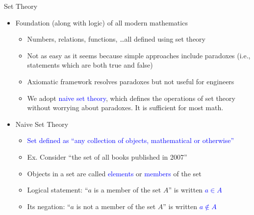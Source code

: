 \documentclass[10pt,english]{beamer}
\begin{document}
\begin{frame}{Set Theory}

\begin{itemize}
\setlength\itemsep{3mm}
\item<1-> Foundation (along with logic) of all modern mathematics \vspace{1mm}
\begin{itemize} 
  \setlength\itemsep{1.5mm}
  \item Numbers, relations, functions, \ldots all defined using set theory
  \item Not as easy as it seems because simple approaches include paradoxes (i.e., statements which are both true and false)
  \item Axiomatic framework resolves paradoxes but not useful for engineers
  \item We adopt \textcolor{blue}{naive set theory}, which defines the operations of set theory without worrying about paradoxes. It is sufficient for most math.
\end{itemize}

\item<2-> Naive Set Theory \vspace{1mm}
\begin{itemize} 
  \setlength\itemsep{1.5mm}
  \item \textcolor{blue}{Set defined as ``any collection of objects, mathematical or otherwise''}
  \item Ex. Consider ``the set of all books published in 2007''
  \item Objects in a set are called \textcolor{blue}{elements} or \textcolor{blue}{members} of the set
  \item Logical statement: ``$a$ is a member of the set $A$'' is written \textcolor{blue}{$a \in A$}
  \item Its negation: ``$a$ is not a member of the set $A$'' is written \textcolor{blue}{$a \notin A$}
\end{itemize}
\end{itemize}
\end{frame}
\end{document}
